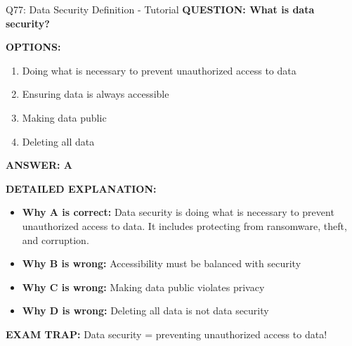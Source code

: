 \documentclass[8pt]{beamer}
\begin{document}
	\begin{frame}{Q77: Data Security Definition - Tutorial}
		\fontsize{6.5}{7.5}\selectfont
		\textbf{QUESTION: What is data security?}
		
		\vspace{0.1cm}
		\textbf{OPTIONS:}
		\begin{enumerate}
			\item Doing what is necessary to prevent unauthorized access to data
			\item Ensuring data is always accessible
			\item Making data public
			\item Deleting all data
		\end{enumerate}
		
		\vspace{0.1cm}
		\textcolor{myblue}{\textbf{ANSWER: A}}
		
		\vspace{0.1cm}
		\textbf{DETAILED EXPLANATION:}
		\begin{itemize}
			\item \textbf{Why A is correct:} Data security is doing what is necessary to prevent unauthorized access to data. It includes protecting from ransomware, theft, and corruption.
			\item \textbf{Why B is wrong:} Accessibility must be balanced with security
			\item \textbf{Why C is wrong:} Making data public violates privacy
			\item \textbf{Why D is wrong:} Deleting all data is not data security
		\end{itemize}
		
		\textcolor{myred}{\textbf{EXAM TRAP:}} Data security = \textcolor{myblue}{preventing unauthorized access} to data!
	\end{frame}
	
\end{document}
